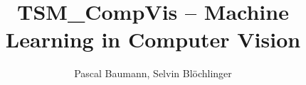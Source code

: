 \documentclass[x11names,11pt,a4paper]{article}
\theoremstyle{definition}
\begin{document}
\title{TSM\_CompVis -- Machine Learning in Computer Vision}
\author{Pascal Baumann, Selvin Blöchlinger}
\maketitle


\tableofcontents
\newpage











\clearpage
\appendix
\end{document}
